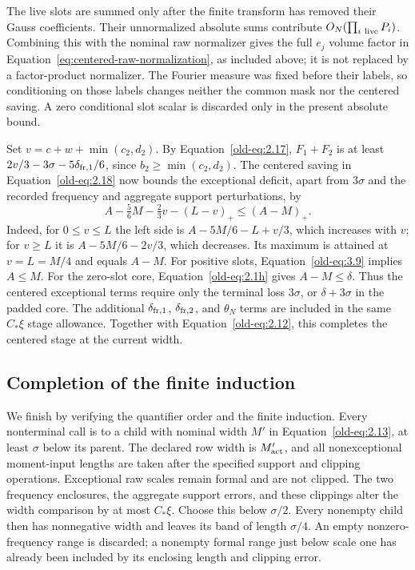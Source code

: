 \documentclass[11pt,a4paper]{article}
\numberwithin{equation}{section}
\numberwithin{figure}{section}
\theoremstyle{definition}
\theoremstyle{remark}
\begin{document}
The live slots are summed only after the finite transform has removed
their Gauss coefficients.  Their unnormalized absolute sums contribute
\(O_N(\prod_{i\ {\rm live}}P_i)\).  Combining this with the nominal
raw normalizer gives the full \(e_j\) volume factor in
Equation~\eqref{eq:centered-raw-normalization}, as included above; it
is not replaced by a factor-product normalizer.  The Fourier measure was fixed before
their labels, so conditioning on those labels changes neither the
common mask nor the centered saving.  A zero conditional slot scalar
is discarded only in the present absolute bound.

Set \(v=c+w+\min(c_2,d_2)\).  By
Equation~\eqref{old-eq:2.17}, \(F_1+F_2\) is at least
\(2v/3-3\sigma-5\delta_{{\rm fr},1}/6\), since
\(b_2\ge\min(c_2,d_2)\).
The centered saving in Equation~\eqref{old-eq:2.18} now bounds
the exceptional deficit, apart from \(3\sigma\) and the recorded
frequency and aggregate support perturbations, by
\begin{equation}
 A-\tfrac56M-\tfrac23v-(L-v)_+
 \le (A-M)_+.
 \label{old-eq:2.19}
\end{equation}
Indeed, for \(0\le v\le L\) the left side is
\(A-5M/6-L+v/3\), which increases with \(v\); for
\(v\ge L\) it is \(A-5M/6-2v/3\), which decreases.
Its maximum is attained at \(v=L=M/4\) and equals \(A-M\).
For positive slots, Equation~\eqref{old-eq:3.9} implies
\(A\le M\).  For the zero-slot core,
Equation~\eqref{old-eq:2.1h} gives \(A-M\le\delta\).
Thus the centered exceptional terms require only the terminal
loss \(3\sigma\), or \(\delta+3\sigma\) in the padded core.
The additional \(\delta_{{\rm fr},1}\), \(\delta_{{\rm fr},2}\),
and \(\theta_N\) terms are included in the same \(C_*\xi\)
stage allowance.
Together with Equation~\eqref{old-eq:2.12}, this completes the
centered stage at the current width.

\subsection{Completion of the finite induction}

We finish by verifying the quantifier order and the finite induction.
Every nonterminal call is to a child with nominal width \(M'\) in
Equation~\eqref{old-eq:2.13}, at least \(\sigma\) below its parent.
The declared row width is \(M'_{\rm act}\), and all nonexceptional
moment-input lengths are taken after the specified support and clipping
operations.  Exceptional raw scales remain formal and are not clipped.
The two frequency enclosures, the aggregate support errors, and these
clippings alter the width comparison by at most \(C_*\xi\).  Choose
this below \(\sigma/2\).  Every nonempty child then has nonnegative
width and leaves its band of length \(\sigma/4\).  An empty
nonzero-frequency range is discarded; a nonempty formal range just
below scale one has already been included by its enclosing length and
clipping error.
\end{document}
